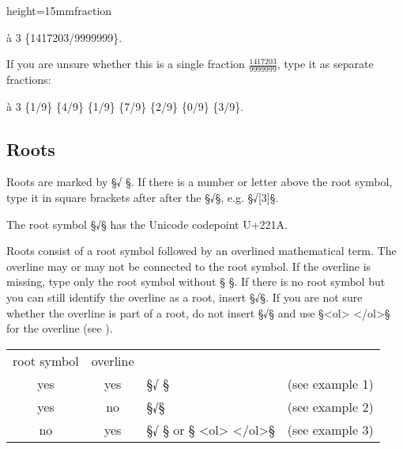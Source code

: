 \begin{sampleImageSmall}{height=15mm}{fraction}

\begin{typeMath}
à 3 \{1417203/9999999\}.
\end{typeMath}

If you are unsure whether this is a single fraction $\frac{1417203}{9999999}$, type it as separate fractions:

\begin{typeMath}
à 3 \{1/9\} \{4/9\} \{1/9\} \{7/9\} \{2/9\} \{0/9\} \{3/9\}.
\end{typeMath}

\end{sampleImageSmall}


\tocspace
\subsection{Roots}
\label{section roots}

\begin{mainrule}
Roots are marked by §√{ }§. If there is a number or letter above the root symbol, type it in square brackets after after the §√§, e.g. §√[3]§.
\end{mainrule}

\begin{clarification}
The root symbol §√§ has the Unicode codepoint U+221A. 
\end{clarification}

\begin{clarification}
Roots consist of a root symbol followed by an overlined mathematical term. The overline may or may not be connected to the root symbol. 
If the overline is missing, type only the root symbol without §{ }§. 
If there is no root symbol but you can still identify the overline as a root, insert §√§. If you are not sure whether the overline is part of a root, do not insert §√§ and use §<ol> </ol>§ for the overline (see ).
\end{clarification}

\vspace{3mm}
\begin{tabelle}

\vspace{-1mm}
\begin{tabular}{@{}cc@{\qquad}l@{\qquad}l}
root symbol & overline & & \\[2mm]
yes & yes & §√{ }§ & (see example 1) \\[1mm]
yes & no & §√§ & (see example 2) \\[1mm]
no & yes & §√{ }§ or § <ol> </ol>§ & (see example 3) \\
\end{tabular}
\end{tabelle}

